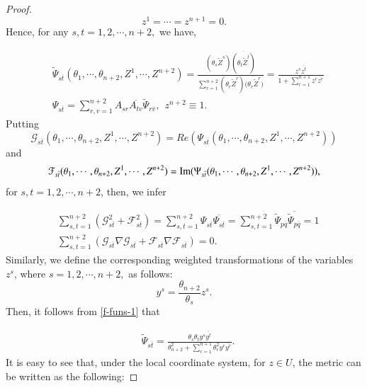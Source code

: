 \documentclass[12pt]{article}
\numberwithin{equation}{section}
\begin{document}
\begin{proof}
\begin{equation*}z^{1}=\cdots=z^{n+1}=0.\end{equation*}
Hence, for any $s,t = 1,2,\cdots,n+2,$ we have,



\begin{equation}\begin{aligned}\label{f-funs-1}&\widetilde{\Psi}_{s\overline{t}}(\theta_{1},\cdots,
\theta_{n+2},Z^{1},\cdots,Z^{n+2})=\frac{(\theta_{s}\widetilde{Z}^{s})\overline{(\theta_{t}\widetilde{Z}^{t})}}
{\sum^{n+2}_{r=1}(\theta_{r}\widetilde{Z}^{r})\overline{(\theta_{r}\widetilde{Z}^{r}})}
=\frac{z^{s}\overline{z^{t}}}{1+\sum^{n+1}_{r=1}z^{r}\overline{z^{r}}}\\
&\Psi_{s\overline{t}}=\sum^{n+2}_{r,v=1}A_{sr}\overline{A_{tv}}\widetilde{\Psi}_{r\overline{v}},\ \ z^{n+2}\equiv1.\end{aligned}\end{equation}
Putting $$\mathcal{G}_{s\overline{t}}(\theta_{1},\cdots,\theta_{n+2},Z^{1},\cdots,Z^{n+2})= Re(\Psi_{s\overline{t}}(\theta_{1},\cdots,\theta_{n+2},Z^{1},\cdots,Z^{n+2}))$$
and $$\mathcal{F}_{s\overline{t}}(\theta_{1},\cdots,\theta_{n+2},Z^{1},\cdots,Z^{n+2})
={\rm Im}(\Psi_{s\overline{t}}(\theta_{1},\cdots,\theta_{n+2},Z^{1},\cdots,Z^{n+2})),$$ for $s,t=1,2,\cdots,n+2$, then, we infer


\begin{equation*}\begin{aligned}&\sum^{n+2}_{s,t=1}\left(\mathcal{G}^{2}_{s\overline{t}}+\mathcal{F}^{2}_{s\overline{t}}\right)
=\sum^{n+2}_{s,t=1}\Psi_{s\overline{t}}\overline{\Psi_{s\overline{t}}}
=\sum^{n+2}_{s,t=1}\widetilde{\Psi}_{p\overline{q}}\overline{\widetilde{\Psi}_{p\overline{q}}}=1\\
&\sum^{n+2}_{s,t=1}\left(\mathcal{G}_{s\overline{t}}\nabla \mathcal{G}_{s\overline{t}}+\mathcal{F}_{s\overline{t}}
\nabla \mathcal{F}_{s\overline{t}}\right)=0.\end{aligned}\end{equation*}
Similarly, we define the corresponding weighted transformations of the variables $z^{s}$, where $s=1,2,\cdots, n+2,$ as follows:  $$y^{s}=\frac{\theta_{n+2}}{\theta_{s}}z^{s}.$$ Then, it follows from \eqref{f-funs-1} that


\begin{equation}\begin{aligned}\label{f-funs-2}&\widetilde{\Psi}_{s\overline{t}}
=\frac{\theta_{s}\theta_{t}y^{s}\overline{y^{t}}}{\theta^{2}_{n+2}+\sum^{n+1}_{r=1}\theta^{2}_{r}y^{r}\overline{y^{r}}}.\end{aligned}\end{equation}
It is easy to see that, under the local coordinate system, for $z\in U$, the metric can be written as the following:


\end{proof}
\end{document}
